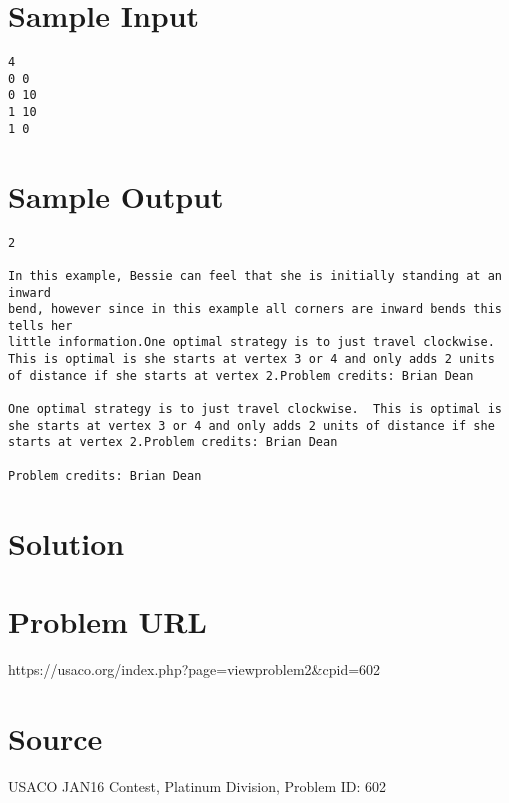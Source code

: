 \documentclass[12pt]{article}
\begin{document}
\section*{Sample Input}
\begin{verbatim}
4
0 0
0 10
1 10
1 0
\end{verbatim}

\section*{Sample Output}
\begin{verbatim}
2

In this example, Bessie can feel that she is initially standing at an inward
bend, however since in this example all corners are inward bends this tells her
little information.One optimal strategy is to just travel clockwise.  This is optimal is she starts at vertex 3 or 4 and only adds 2 units of distance if she starts at vertex 2.Problem credits: Brian Dean

One optimal strategy is to just travel clockwise.  This is optimal is she starts at vertex 3 or 4 and only adds 2 units of distance if she starts at vertex 2.Problem credits: Brian Dean

Problem credits: Brian Dean
\end{verbatim}

\section*{Solution}


\section*{Problem URL}
https://usaco.org/index.php?page=viewproblem2&cpid=602

\section*{Source}
USACO JAN16 Contest, Platinum Division, Problem ID: 602
\end{document}
